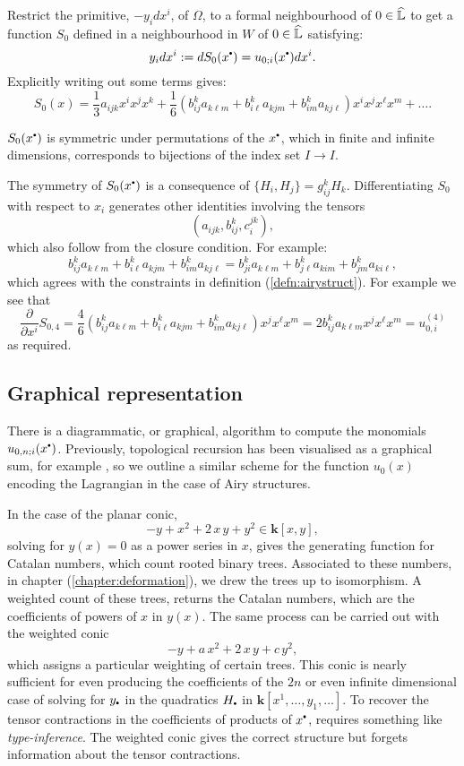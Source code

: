    Restrict the primitive, \(-y_idx^i\), of \(\Omega\), to a formal neighbourhood of \(0\in \widehat{\mathbb{L}}\) to get a function \(S_0\) defined in a neighbourhood in \(W\) of \(0 \in \widehat{\mathbb{L}}\) satisfying:
    \[y_idx^i:=dS_0(x^{\sbt}) = u_{0;i}(x^{\sbt}) dx^i.\]
    Explicitly writing out some terms gives:
    \[S_0(x)=\frac{1}{3} a_{ijk}x^ix^jx^k+\frac{1}{6} \left(b_{ij}^k a_{k\ell m}+b_{i\ell}^k a_{kj m}+b_{im}^ka_{kj\ell}\right)x^ix^jx^\ell x^m + \dots.
    \]
    \begin{lem}
        \(S_0(x^{\sbt})\) is symmetric under permutations of the \( x^{\sbt}\), which in finite and infinite dimensions, corresponds to bijections of the index set \( I \rightarrow I\).
    \end{lem}
    The symmetry of \(S_0(x^{\sbt})\) is a consequence of \( \{ H_i, H_j \} = g_{ij}^k H_k\).  Differentiating \(S_0\) with respect to \(x_i\) generates other identities involving the tensors
    \[ (a_{ijk},b_{ij}^{k}, c_{i}^{jk}),\]
    which also follow from the closure condition. 
    For example:
    \[ b_{ij}^ka_{k\ell m}+b_{i\ell}^ka_{kj m}+b_{im}^ka_{kj\ell}= b_{ji}^ka_{k\ell m}+b_{j\ell}^ka_{ki m}+b_{jm}^ka_{ki\ell},
    \]
    which agrees with the constraints in definition (\ref{defn:airystruct}). For example we see that
    \[\frac{\partial}{\partial x^i} S_{0,4}=\frac{4}{6}(b_{ij}^ka_{k\ell m}+b_{i\ell}^ka_{kj m}+b_{im}^ka_{kj\ell})x^jx^\ell x^m= 2 b_{ij}^ka_{k\ell m}x^jx^\ell x^m=u_{0,i}^{(4)}\]
    as required.  
    
    
    
    
    \subsection{Graphical representation}
    
    There is a diagrammatic, or graphical, algorithm to compute the monomials \( u_{0,n; i}(x^{\sbt})\). Previously, topological recursion has been visualised as a graphical sum, for example \cite{eynard_orantin}, so we outline a similar scheme for the function \(u_0(x)\) encoding the Lagrangian in the case of Airy structures. 

    In the case of the planar conic, 
    \[ -y + x^2 + 2 \,x \,y + y^2 \in  \mathbf{k}[x,y],\]
    solving for \(y(x)=0\) as a power series in \(x\), gives the generating function for Catalan numbers, which count rooted binary trees. Associated to these numbers, in chapter (\ref{chapter:deformation}), we drew the trees up to isomorphism. A weighted count of these trees, returns the Catalan numbers, which are the coefficients of powers of \(x\) in \(y(x)\).  The same process can be carried out with the weighted conic 
    \[ - y + a \, x^2  + 2 \, x\,y + c \, y^2,\]
    which assigns a particular weighting of certain trees. This conic is nearly sufficient for even producing the coefficients of the \(2n\) or even infinite dimensional case of solving for \(y_{\sbt}\) in the quadratics \(H_{\sbt}\) in \( \mathbf{k}[x^1, \dots , y_1, \dots ]\). To recover the tensor contractions in the coefficients of products of \(x^{\sbt}\), requires something like \emph{type-inference}.  The weighted conic gives the correct structure but forgets information about the tensor contractions.
    
